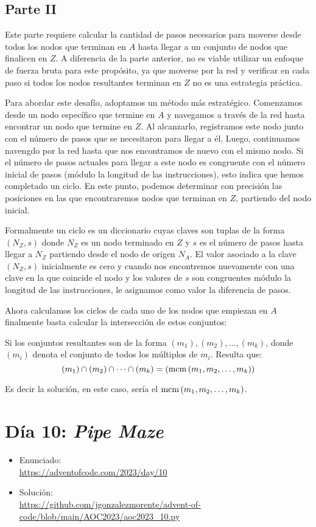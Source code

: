 \documentclass[a4paper,12pt]{article}
\begin{document}
\subsection{Parte II}

Este parte requiere calcular la cantidad de pasos necesarios para moverse desde todos los nodos que terminan en $A$ hasta llegar a un conjunto de nodos que finalicen en $Z$. A diferencia de la parte anterior, no es viable utilizar un enfoque de fuerza bruta para este propósito, ya que moverse por la red y verificar en cada paso si todos los nodos resultantes terminan en $Z$ no es una estrategia práctica.

Para abordar este desafío, adoptamos un método más estratégico. Comenzamos desde un nodo específico que termine en $A$ y navegamos a través de la red hasta encontrar un nodo que termine en $Z$. Al alcanzarlo, registramos este nodo junto con el número de pasos que se necesitaron para llegar a él. Luego, continuamos navengdo por la red hasta que nos encontramos de nuevo con el mismo nodo. Si el número de pasos actuales para llegar a este nodo es congruente con el número inicial de pasos (módulo la longitud de las instrucciones), esto indica que hemos completado un ciclo. En este punto, podemos determinar con precisión las posiciones en las que encontraremos nodos que terminan en $Z$, partiendo del nodo inicial.

Formalmente un ciclo es un diccionario cuyas claves son tuplas de la forma $(N_Z, s)$ donde $N_Z$ es un nodo terminado en $Z$ y $s$ es el número de pasos hasta llegar a $N_Z$ partiendo desde el nodo de origen $N_A$. El valor asociado a la clave $(N_Z, s)$ inicialmente es cero y cuando nos encontremos nuevamente con una clave en la que coincide el nodo y los valores de $s$ son congruentes módulo la longitud de las instrucciones, le asignamos como valor la diferencia de pasos.

Ahora calculamos los ciclos de cada uno de los nodos que empiezan en $A$ finalmente basta calcular la intersección de estos conjuntos: 

Si los conjuntos resultantes son de la forma $(m_1), (m_2),\dots, (m_k)$, donde $(m_i)$ denota el conjunto de todos los múltiplos de $m_i$. Resulta que:
$$(m_1)\cap (m_2)\cap\cdots\cap(m_k)=(\operatorname{\rm mcm}\left(m_1,m_2,\dots,m_k\right))$$

Es decir la solución, en este caso, sería el $\operatorname{\rm mcm}\left(m_1,m_2,\dots,m_k\right)$.

\section{Día 10: \textnormal{ \it Pipe Maze}}
\begin{itemize}
    \item Enunciado: \\
    \href{https://adventofcode.com/2023/day/10}{https://adventofcode.com/2023/day/10}
    \item Solución: \\ 
    \href{https://github.com/jgonzalezmorente/advent-of-code/blob/main/AOC2023/aoc2023_10.py}{https://github.com/jgonzalezmorente/advent-of-code/blob/main/AOC2023/aoc2023\_10.py}
\end{itemize}
\end{document}
